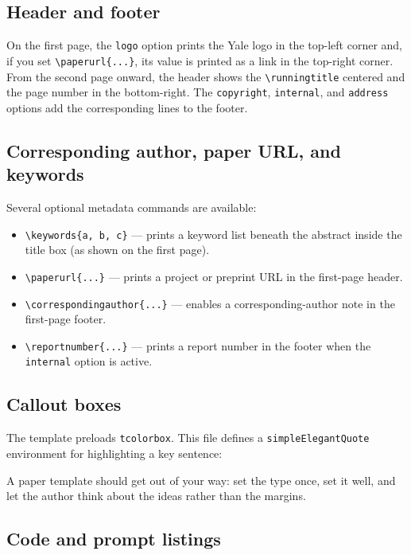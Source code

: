\documentclass[11pt,letterpaper,logo]{yalearxiv}
\begin{document}
\subsection{Header and footer}
\label{sec:headerfooter}

On the first page, the \verb+logo+ option prints the Yale logo in the top-left
corner and, if you set \verb+\paperurl{...}+, its value is printed as a link in
the top-right corner. From the second page onward, the header shows the
\verb+\runningtitle+ centered and the page number in the bottom-right. The
\verb+copyright+, \verb+internal+, and \verb+address+ options add the
corresponding lines to the footer.

\subsection{Corresponding author, paper URL, and keywords}
\label{sec:metadata}

Several optional metadata commands are available:
\begin{itemize}
  \item \verb+\keywords{a, b, c}+ --- prints a keyword list beneath the abstract
    inside the title box (as shown on the first page).
  \item \verb+\paperurl{...}+ --- prints a project or preprint URL in the
    first-page header.
  \item \verb+\correspondingauthor{...}+ --- enables a corresponding-author note
    in the first-page footer.
  \item \verb+\reportnumber{...}+ --- prints a report number in the footer when
    the \verb+internal+ option is active.
\end{itemize}

\subsection{Callout boxes}
\label{sec:callout}

The template preloads \verb+tcolorbox+. This file defines a \verb+simpleElegantQuote+
environment for highlighting a key sentence:

\begin{simpleElegantQuote}
A paper template should get out of your way: set the type once, set it well, and
let the author think about the ideas rather than the margins.
\end{simpleElegantQuote}

\subsection{Code and prompt listings}
\label{sec:listings}
\end{document}
